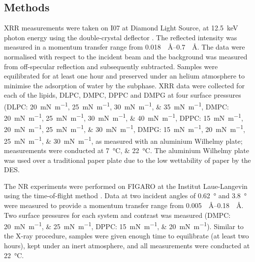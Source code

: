 \documentclass[amsmath,amssymb,twocolumn,superscriptaddress]{revtex4-1}
\begin{document}
\subsection{Methods}
%
XRR measurements were taken on I07 at Diamond Light Source, at \SI{12.5}{\kilo\electronvolt} photon energy using the double-crystal deflector \cite{arnold_implementation_2012}.
The reflected intensity was measured in a momentum transfer range from \SIrange{0.018}{0.7}{\per\angstrom}.
The data were normalised with respect to the incident beam and the background was measured from off-specular reflection and subsequently subtracted.
Samples were equilibrated for at least one hour and preserved under an helium atmosphere to minimise the adsorption of water by the subphase.
XRR data were collected for each of the lipids, DLPC, DMPC, DPPC and DMPG at four surface pressures (DLPC: \SIlist[list-units = single]{20;25;30;35}{\milli\newton\per\meter}, DMPC: \SIlist[list-units = single]{20;25;30;40}{\milli\newton\per\meter}, DPPC: \SIlist[list-units = single]{15;20;25;30}{\milli\newton\per\meter}, DMPG: \SIlist[list-units = single]{15;20;25;30}{\milli\newton\per\meter}, as measured with an aluminium Wilhelmy plate; measurements were conducted at \SIlist{7;22}{\celsius}.
The aluminium Wilhelmy plate was used over a traditional paper plate due to the low wettability of paper by the DES.

The NR experiments were performed on FIGARO at the Institut Laue-Langevin using the time-of-flight method \cite{campbell_figaro_2011}.
Data at two incident angles of \SI{0.62}{\degree} and \SI{3.8}{\degree} were measured to provide a momentum transfer range from \SIrange{0.005}{0.18}{\per\angstrom}.
Two surface pressures for each system and contrast was measured (DMPC: \SIlist[list-units = single]{20;25}{\milli\newton\per\meter}, DPPC: \SIlist[list-units = single]{15;20}{\milli\newton\per\meter}).
Similar to the X-ray procedure, samples were given enough time to equilibrate (at least two hours), kept under an inert atmosphere, and all measurements were conducted at \SI{22}{\celsius}.
\end{document}
